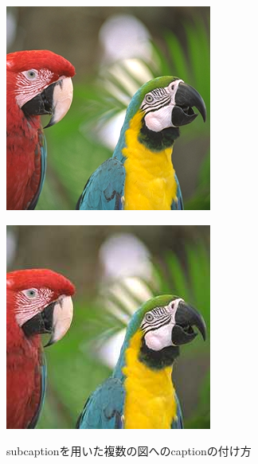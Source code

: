 \documentclass[dvipdfmx,disablejfam,nosetpagesize,12pt]{jsbook}
\begin{document}
\begin{figure}[tp]
   \centering
   \begin{minipage}[c]{.45\hsize}
      \centering
      \includegraphics[width=.6\hsize]{figure/example-png.png}
      \label{Fig.example-subcaption.a}
   \end{minipage}
   \begin{minipage}[c]{.45\hsize}
      \centering
      \includegraphics[width=.6\hsize]{figure/example-jpg.jpg}
      \label{Fig.example-subcaption.b}
   \end{minipage}
   \caption{subcaptionを用いた複数の図へのcaptionの付け方}
   \label{Fig.example-subcaption}
\end{figure}
\end{document}
